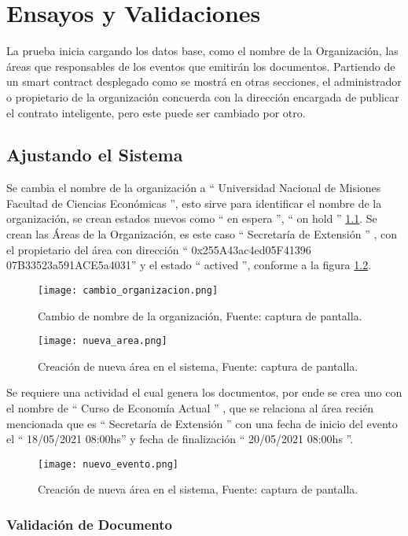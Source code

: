 \chapter{Ensayos y Validaciones}
La prueba inicia cargando los datos base, como el nombre de la Organización, las áreas que responsables de los eventos que emitirán los documentos.
Partiendo de un smart contract desplegado como se mostrá en otras secciones, el administrador o propietario de la organización concuerda con la dirección encargada 
de publicar el contrato inteligente, pero este puede ser cambiado por otro.
\section{Ajustando el Sistema}

Se cambia el nombre de la organización a “ Universidad Nacional de Misiones Facultad de Ciencias Económicas ”, esto sirve para identificar el nombre de la organización, se 
crean estados nuevos como “ en espera ”, “ on hold ” \ref{img:cambio_org}.
Se crean las Áreas de la Organización, es este caso “ Secretaría de Extensión ” , con el propietario del área con dirección  “ 0x255A43ac4ed05F41396 07B33523a591ACE5a4031”
y el estado “ actived ”, conforme a la figura  \ref{img:nuva_area}.
\begin{figure}[H]
  \centering
  {\texttt{[image: cambio\_organizacion.png]}}
  \caption{Cambio de nombre de la organización,  Fuente: captura de pantalla. }
  \label{img:cambio_org}
\end{figure}

\begin{figure}[H]
  \centering
  {\texttt{[image: nueva\_area.png]}}
  \caption{Creación de nueva área en el sistema,  Fuente: captura de pantalla. }
  \label{img:nuva_area}
\end{figure}
Se requiere una actividad  el cual genera los documentos, por ende se crea uno con el nombre de “ Curso de Economía Actual ” , que se relaciona al área recién mencionada que es 
“ Secretaría de Extensión ” con una fecha de inicio del evento el “ 18/05/2021 08:00hs” y fecha de finalización “ 20/05/2021 08:00hs ”.
\begin{figure}[H]
  \centering
  {\texttt{[image: nuevo\_evento.png]}}
  \caption{Creación de nueva área en el sistema,  Fuente: captura de pantalla. }
  \label{img:nuevo_evento}
\end{figure}




\subsection{Validación de Documento}

